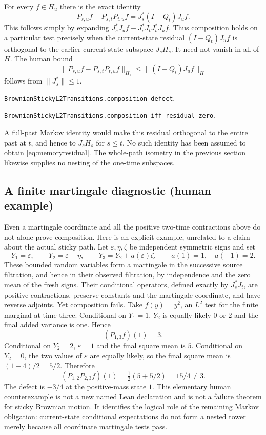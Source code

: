\documentclass[11pt]{article}
\newcommand{\code}[1]{\texttt{\small #1}}
\begin{document}
For every $f\in H_u$ there is the exact identity
\begin{equation}\label{eq:memoryresidual}
 P_{s,u}f-P_{s,t}P_{t,u}f
       =J_s^*(I-Q_t)J_uf.
\end{equation}
This follows simply by expanding
$J_s^*J_uf-J_s^*J_tJ_t^*J_uf$. Thus composition holds on a
particular test precisely when the current-state residual
$(I-Q_t)J_uf$ is orthogonal to the earlier current-state subspace
$J_sH_s$. It need not vanish in all of $H$. The human bound
\[
 \|P_{s,u}f-P_{s,t}P_{t,u}f\|_{H_s}
 \leq\|(I-Q_t)J_uf\|_H
\]
follows from $\|J_s^*\|\leq1$.
\par\noindent\code{BrownianStickyL2Transitions.composition\_defect}.
\par\noindent\code{BrownianStickyL2Transitions.composition\_iff\_residual\_zero}.

A full-past Markov identity would make this residual orthogonal
to the entire past at $t$, and hence to $J_sH_s$ for $s\leq t$.
No such identity has been assumed to obtain
\eqref{eq:memoryresidual}. The whole-path isometry in the previous
section likewise supplies no nesting of the one-time subspaces.

\subsection*{A finite martingale diagnostic (human example)}
Even a martingale coordinate and all the positive two-time
contractions above do not alone prove composition. Here is an
explicit example, unrelated to a claim about the actual sticky path.
Let $\varepsilon,\eta,\zeta$ be independent symmetric signs and set
\[
 Y_1=\varepsilon,\qquad Y_2=\varepsilon+\eta,\qquad
 Y_3=Y_2+a(\varepsilon)\zeta,\qquad
 a(1)=1,\quad a(-1)=2.
\]
These bounded random variables form a martingale in the successive
source filtration, and hence in their observed filtration, by
independence and the zero mean of the fresh signs. Their conditional
operators, defined exactly by $J_s^*J_t$, are positive contractions,
preserve constants and the martingale coordinate, and have reverse
adjoints. Yet composition fails. Take $f(y)=y^2$, an $L^2$ test
for the finite marginal at time three. Conditional on $Y_1=1$,
$Y_2$ is equally likely $0$ or $2$ and the final added variance
is one. Hence
\[
 (P_{1,3}f)(1)=3.
\]
Conditional on $Y_2=2$, $\varepsilon=1$ and the final square
mean is $5$. Conditional on $Y_2=0$, the two values of
$\varepsilon$ are equally likely, so the final square mean is
$(1+4)/2=5/2$. Therefore
\[
 (P_{1,2}P_{2,3}f)(1)=\tfrac12(5+5/2)=15/4\ne3.
\]
The defect is $-3/4$ at the positive-mass state $1$.
This elementary human counterexample is not a new named Lean
declaration and is not a failure theorem for sticky Brownian motion.
It identifies the logical role of the remaining Markov obligation:
current-state conditional expectations do not form a nested tower
merely because all coordinate martingale tests pass.
\end{document}
